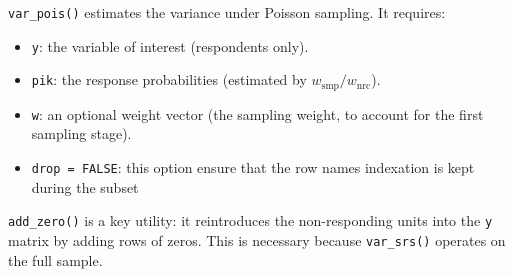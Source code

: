 \documentclass[
]{article}
\newenvironment{Shaded}{\begin{snugshade}}{\end{snugshade}}
\newcommand{\AttributeTok}[1]{\textcolor[rgb]{0.13,0.29,0.53}{#1}}
\newcommand{\ConstantTok}[1]{\textcolor[rgb]{0.56,0.35,0.01}{#1}}
\newcommand{\FunctionTok}[1]{\textcolor[rgb]{0.13,0.29,0.53}{\textbf{#1}}}
\newcommand{\NormalTok}[1]{#1}
\newcommand{\OtherTok}[1]{\textcolor[rgb]{0.56,0.35,0.01}{#1}}
\newcommand{\SpecialCharTok}[1]{\textcolor[rgb]{0.81,0.36,0.00}{\textbf{#1}}}
\newcommand{\StringTok}[1]{\textcolor[rgb]{0.31,0.60,0.02}{#1}}
\providecommand{\tightlist}{%
  \setlength{\itemsep}{0pt}\setlength{\parskip}{0pt}}
\begin{document}
\begin{Shaded}
\end{Shaded}

\texttt{var\_pois()} estimates the variance under Poisson sampling. It
requires:

\begin{itemize}
\tightlist
\item
  \texttt{y}: the variable of interest (respondents only).
\item
  \texttt{pik}: the response probabilities (estimated by
  \(w_{\text{smp}} / w_{\text{nrc}}\)).
\item
  \texttt{w}: an optional weight vector (the sampling weight, to account
  for the first sampling stage).
\item
  \texttt{drop\ =\ FALSE}: this option ensure that the row names
  indexation is kept during the subset
\end{itemize}

\texttt{add\_zero()} is a key utility: it reintroduces the
non-responding units into the \texttt{y} matrix by adding rows of zeros.
This is necessary because \texttt{var\_srs()} operates on the full
sample.
\end{document}
